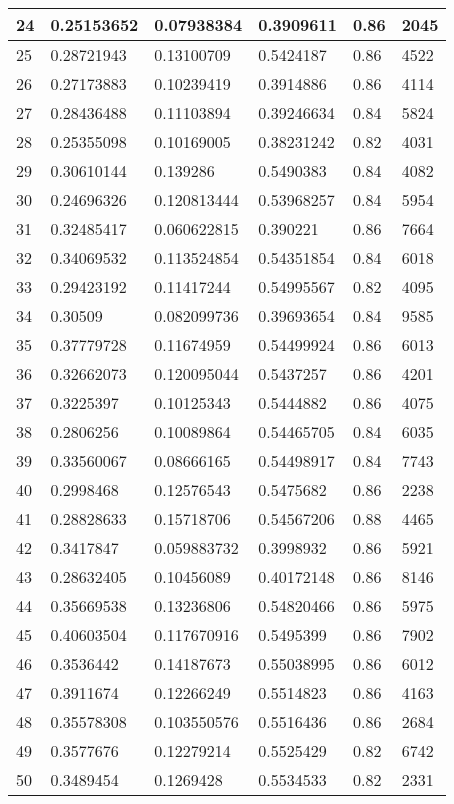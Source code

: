 \begin{longtable}{|l|l|l|l|l|l|}
24 & 0.25153652 & 0.07938384 & 0.3909611 & 0.86 & 2045 \\ \hline 
25 & 0.28721943 & 0.13100709 & 0.5424187 & 0.86 & 4522 \\ \hline 
26 & 0.27173883 & 0.10239419 & 0.3914886 & 0.86 & 4114 \\ \hline 
27 & 0.28436488 & 0.11103894 & 0.39246634 & 0.84 & 5824 \\ \hline 
28 & 0.25355098 & 0.10169005 & 0.38231242 & 0.82 & 4031 \\ \hline 
29 & 0.30610144 & 0.139286 & 0.5490383 & 0.84 & 4082 \\ \hline 
30 & 0.24696326 & 0.120813444 & 0.53968257 & 0.84 & 5954 \\ \hline 
31 & 0.32485417 & 0.060622815 & 0.390221 & 0.86 & 7664 \\ \hline 
32 & 0.34069532 & 0.113524854 & 0.54351854 & 0.84 & 6018 \\ \hline 
33 & 0.29423192 & 0.11417244 & 0.54995567 & 0.82 & 4095 \\ \hline 
34 & 0.30509 & 0.082099736 & 0.39693654 & 0.84 & 9585 \\ \hline 
35 & 0.37779728 & 0.11674959 & 0.54499924 & 0.86 & 6013 \\ \hline 
36 & 0.32662073 & 0.120095044 & 0.5437257 & 0.86 & 4201 \\ \hline 
37 & 0.3225397 & 0.10125343 & 0.5444882 & 0.86 & 4075 \\ \hline 
38 & 0.2806256 & 0.10089864 & 0.54465705 & 0.84 & 6035 \\ \hline 
39 & 0.33560067 & 0.08666165 & 0.54498917 & 0.84 & 7743 \\ \hline 
40 & 0.2998468 & 0.12576543 & 0.5475682 & 0.86 & 2238 \\ \hline 
41 & 0.28828633 & 0.15718706 & 0.54567206 & 0.88 & 4465 \\ \hline 
42 & 0.3417847 & 0.059883732 & 0.3998932 & 0.86 & 5921 \\ \hline 
43 & 0.28632405 & 0.10456089 & 0.40172148 & 0.86 & 8146 \\ \hline 
44 & 0.35669538 & 0.13236806 & 0.54820466 & 0.86 & 5975 \\ \hline 
45 & 0.40603504 & 0.117670916 & 0.5495399 & 0.86 & 7902 \\ \hline 
46 & 0.3536442 & 0.14187673 & 0.55038995 & 0.86 & 6012 \\ \hline 
47 & 0.3911674 & 0.12266249 & 0.5514823 & 0.86 & 4163 \\ \hline 
48 & 0.35578308 & 0.103550576 & 0.5516436 & 0.86 & 2684 \\ \hline 
49 & 0.3577676 & 0.12279214 & 0.5525429 & 0.82 & 6742 \\ \hline 
50 & 0.3489454 & 0.1269428 & 0.5534533 & 0.82 & 2331 \\ \hline 
\end{longtable}